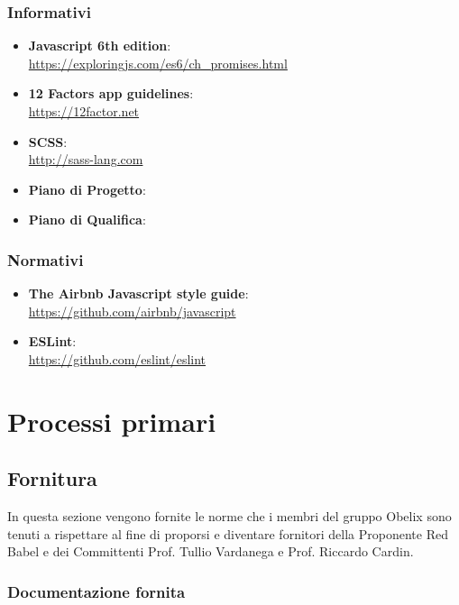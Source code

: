 \subsubsection{Informativi}
\begin{itemize}
\item \textbf{Javascript 6th edition}:\\ \url{https://exploringjs.com/es6/ch\_promises.html}
\item \textbf{12 Factors app guidelines}:\\ \url{https://12factor.net}
\item \textbf{SCSS}: \\ \url{http://sass-lang.com}
\item \textbf{Piano di Progetto}: \\ \pianodiprogetto
\item \textbf{Piano di Qualifica}: \\  \emph{\pianodiqualifica} 
\end{itemize}

\subsubsection{Normativi}
\begin{itemize}
\item \textbf{The Airbnb Javascript style guide}: \\ \url{https://github.com/airbnb/javascript}
\item \textbf{ESLint}: \\ \url{https://github.com/eslint/eslint}
\end{itemize}

\section{Processi primari}

\subsection{Fornitura}
In questa sezione vengono fornite le norme che i membri del gruppo Obelix sono tenuti a rispettare al fine di proporsi e diventare fornitori della Proponente Red Babel e dei Committenti Prof. Tullio Vardanega e Prof. Riccardo Cardin.

\subsubsection{Documentazione fornita}

